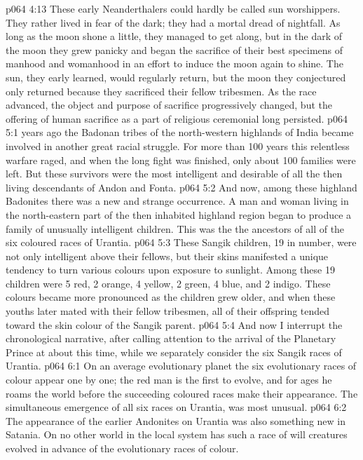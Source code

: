 \vs p064 4:13 These early Neanderthalers could hardly be called sun worshippers. They rather lived in fear of the dark; they had a mortal dread of nightfall. As long as the moon shone a little, they managed to get along, but in the dark of the moon they grew panicky and began the sacrifice of their best specimens of manhood and womanhood in an effort to induce the moon again to shine. The sun, they early learned, would regularly return, but the moon they conjectured only returned because they sacrificed their fellow tribesmen. As the race advanced, the object and purpose of sacrifice progressively changed, but the offering of human sacrifice as a part of religious ceremonial long persisted.
\vs p064 5:1  years ago the Badonan tribes of the north\hyp{}western highlands of India became involved in another great racial struggle. For more than 100 years this relentless warfare raged, and when the long fight was finished, only about 100 families were left. But these survivors were the most intelligent and desirable of all the then living descendants of Andon and Fonta.
\vs p064 5:2 And now, among these highland Badonites there was a new and strange occurrence. A man and woman living in the north\hyp{}eastern part of the then inhabited highland region began  to produce a family of unusually intelligent children. This was the  the ancestors of all of the six coloured races of Urantia.
\vs p064 5:3 These Sangik children, 19 in number, were not only intelligent above their fellows, but their skins manifested a unique tendency to turn various colours upon exposure to sunlight. Among these 19 children were 5 red, 2 orange, 4 yellow, 2 green, 4 blue, and 2 indigo. These colours became more pronounced as the children grew older, and when these youths later mated with their fellow tribesmen, all of their offspring tended toward the skin colour of the Sangik parent.
\vs p064 5:4 And now I interrupt the chronological narrative, after calling attention to the arrival of the Planetary Prince at about this time, while we separately consider the six Sangik races of Urantia.
\vs p064 6:1 On an average evolutionary planet the six evolutionary races of colour appear one by one; the red man is the first to evolve, and for ages he roams the world before the succeeding coloured races make their appearance. The simultaneous emergence of all six races on Urantia,  was most unusual.
\vs p064 6:2 The appearance of the earlier Andonites on Urantia was also something new in Satania. On no other world in the local system has such a race of will creatures evolved in advance of the evolutionary races of colour.
